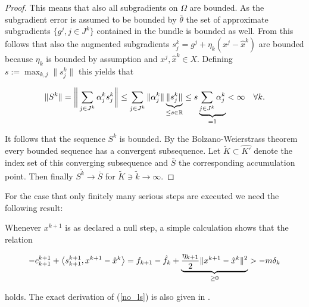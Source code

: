 \begin{proof}
		This means that also all subgradients on \(\Omega\) are bounded. As the subgradient error is assumed to be bounded by \(\bar{\theta}\) the set of approximate subgradients \(\{g^j, j \in J^k\}\) contained in the bundle is bounded as well.
		From this follows that also the augmented subgradients \(s_j^k = g^j+\eta_k(x^j-\hat{x}^k)\) are bounded because \(\eta_k\) is bounded by assumption and \(x^j, \hat{x}^k \in X\).		
Defining \(s:= \max_{k,j}\|s^k_j\|\) this yields that 
		
		\[\Vert S^k\Vert = \bigg\Vert\sum_{j \in J^k}{\alpha_j^k s_j^k}\bigg\Vert \leq  \sum_{j \in J^k}{\Vert\alpha_j^k\Vert\underbrace{\Vert s^k_j\Vert}_{\leq s \in \mathbb{R}}} \leq s\underbrace{\sum_{j \in J^k}{\alpha_j^k}}_{=1} < \infty \quad \forall k. \]
		
		It follows that the sequence \(S^k\) is bounded.
		By the Bolzano-Weierstrass theorem \cite[p. 51]{Koenigsberger2003} every bounded sequence has a convergent subsequence. Let \(\tilde{K} \subset \hat{K'}\) denote the index set of this converging subsequence and \(\bar{S}\) the corresponding accumulation point. Then finally \(S^{\tilde{k}} \to \bar{S}\) for \(\tilde{K} \ni {\tilde{k}}\to \infty\).
		
	
\end{proof}


For the case that only finitely many serious steps are executed we need the following result:


Whenever \(x^{k+1}\) is as declared a null step, a simple calculation shows that the relation 

\begin{equation}
	-c^{k+1}_{k+1} + \left\langle s^{k+1}_{k+1}, x^{k+1}-\hat{x}^k\right\rangle = f_{k+1}-\hat{f}_k + \underbrace{\frac{\eta_{k+1}}{2}\Vert x^{k+1}-\hat{x}^{k}\Vert^2}_{\geq 0}>-m\delta_k
\label{no_ls}
\end{equation}

holds.
The exact derivation of (\ref{no_ls}) is also given in \cite[p. 16]{Hare2016}.

